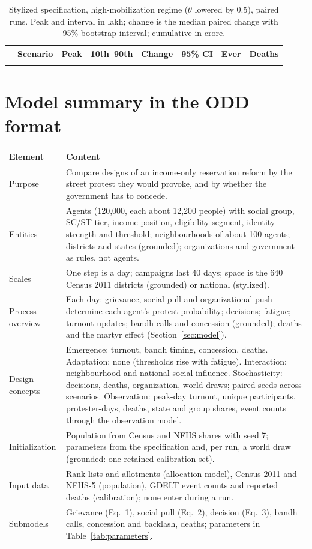 \documentclass[11pt,a4paper]{article}
\begin{document}
\label{app:high}
\begin{table}[H]
\centering\small
\caption{Stylized specification, high-mobilization regime ($\bar\theta$ lowered by 0.5), \RunCountHigh{} paired runs. Peak and interval in lakh; change is the median paired change with 95\% bootstrap interval; cumulative in crore.}
\begin{tabularx}{\linewidth}{@{}lLrrrrrr@{}}
\toprule
 & Scenario & Peak & 10th--90th & Change & 95\% CI & Ever & Deaths\\
\midrule
{}
\bottomrule
\end{tabularx}
\end{table}

\section{Model summary in the ODD format}
\label{app:odd}
\begin{tabularx}{\linewidth}{@{}lL@{}}
\toprule
Element & Content\\
\midrule
Purpose & Compare designs of an income-only reservation reform by the street protest they would provoke, and by whether the government has to concede.\\
Entities & Agents (120{,}000, each about 12{,}200 people) with social group, SC/ST tier, income position, eligibility segment, identity strength and threshold; neighbourhoods of about 100 agents; districts and states (grounded); organizations and government as rules, not agents.\\
Scales & One step is a day; campaigns last 40 days; space is the 640 Census 2011 districts (grounded) or national (stylized).\\
Process overview & Each day: grievance, social pull and organizational push determine each agent's protest probability; decisions; fatigue; turnout updates; bandh calls and concession (grounded); deaths and the martyr effect (Section~\ref{sec:model}).\\
Design concepts & Emergence: turnout, bandh timing, concession, deaths. Adaptation: none (thresholds rise with fatigue). Interaction: neighbourhood and national social influence. Stochasticity: decisions, deaths, organization, world draws; paired seeds across scenarios. Observation: peak-day turnout, unique participants, protester-days, deaths, state and group shares, event counts through the observation model.\\
Initialization & Population from Census and NFHS shares with seed 7; parameters from the specification and, per run, a world draw (grounded: one retained calibration set).\\
Input data & Rank lists and allotments (allocation model), Census 2011 and NFHS-5 (population), GDELT event counts and reported deaths (calibration); none enter during a run.\\
Submodels & Grievance (Eq.~1), social pull (Eq.~2), decision (Eq.~3), bandh calls, concession and backlash, deaths; parameters in Table~\ref{tab:parameters}.\\
\bottomrule
\end{tabularx}
\end{document}
